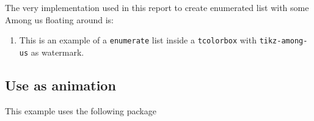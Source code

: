 \documentclass[12pt]{article}
\newenvironment{FHZtcbEnumerate}{%
  \begin{FHZboxEnumerateStyle}\begin{enumerate}}
    {\end{enumerate}\end{FHZboxEnumerateStyle}
}
\begin{document}
The very implementation used in this report to create enumerated list with some Among us floating around is:
\begin{FHZtcbAmongUs}
\newenvironment{FHZtcbEnumerate}{%
  \begin{FHZboxEnumerateStyle}\begin{enumerate}}
    {\end{enumerate}\end{FHZboxEnumerateStyle}
}
\end{FHZtcbAmongUs}

\begin{FHZtcbEnumerate}
  \item This is an example of a \texttt{enumerate} list inside a \texttt{tcolorbox} with \texttt{tikz-among-us} as watermark.
\end{FHZtcbEnumerate}


\subsection{Use as animation}

This example uses the following package
\begin{FHZtcbAmongUs}
\usepackage{animate}
\end{FHZtcbAmongUs}
\end{document}
